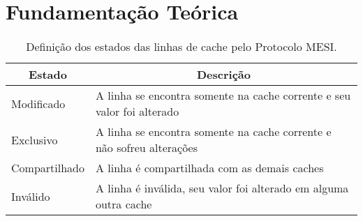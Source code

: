 \chapter[Fundamentação Teórica]{Fundamentação Teórica}
\label{chap:fundamentacao}

\lipsum[4 - 6]

\begin{table}[t]
	\centering
 	\caption{Definição dos estados das linhas de cache pelo Protocolo MESI.}
 	\label{tab:mesi}
	\begin{tabular}{|l|l|}
	\hline
	\multicolumn{1}{|c|}{\textbf{Estado}} & \multicolumn{1}{c|}{\textbf{Descrição}}         \\ \hline
	Modificado 		& A linha se encontra somente na cache corrente e seu valor foi alterado  \\ \hline
	Exclusivo  		& A linha se encontra somente na cache corrente e não sofreu alterações   \\ \hline
	Compartilhado & A linha é compartilhada com as demais caches	                          \\ \hline
	Inválido      & A linha é inválida, seu valor foi alterado em alguma outra cache        \\ \hline
	\end{tabular}
	\vspace{0.2cm}
\end{table}

\lipsum[7 - 10]
